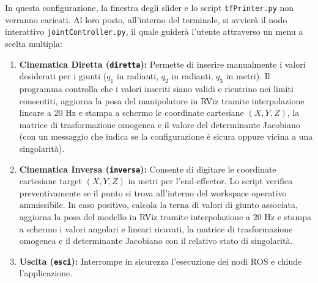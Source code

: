 \documentclass[11pt, a4paper]{report}
\begin{document}
In questa configurazione, la finestra degli slider e lo script \texttt{tfPrinter.py} non verranno caricati. Al loro posto, all'interno del terminale, si avvierà il nodo interattivo \texttt{jointController.py}, il quale guiderà l'utente attraverso un menu a scelta multipla:
\begin{enumerate}
    \item \textbf{Cinematica Diretta (\texttt{diretta}):} Permette di inserire manualmente i valori desiderati per i giunti (\(q_1\) in radianti, \(q_2\) in radianti, \(q_3\) in metri). Il programma controlla che i valori inseriti siano validi e rientrino nei limiti consentiti, aggiorna la posa del manipolatore in RViz tramite interpolazione lineare a 20 Hz e stampa a schermo le coordinate cartesiane $(X, Y, Z)$, la matrice di trasformazione omogenea e il valore del determinante Jacobiano (con un messaggio che indica se la configurazione è sicura oppure vicina a una singolarità).

    \item \textbf{Cinematica Inversa (\texttt{inversa}):} Consente di digitare le coordinate cartesiane target \((X, Y, Z)\) in metri per l'end-effector. Lo script verifica preventivamente se il punto si trova all'interno del workspace operativo ammissibile. In caso positivo, calcola la terna di valori di giunto associata, aggiorna la posa del modello in RViz tramite interpolazione a 20 Hz e stampa a schermo i valori angolari e lineari ricavati, la matrice di trasformazione omogenea e il determinante Jacobiano con il relativo stato di singolarità.

    \item \textbf{Uscita (\texttt{esci}):} Interrompe in sicurezza l'esecuzione dei nodi ROS e chiude l'applicazione.
\end{enumerate}
\end{document}
